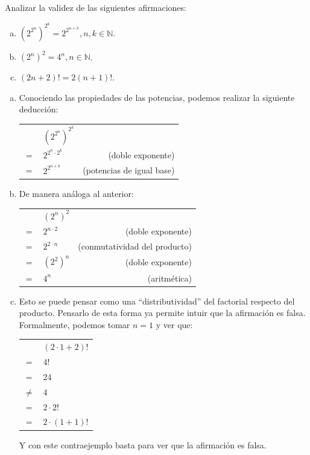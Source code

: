 \begin{problem}{}{}

    Analizar la validez de las siguientes afirmaciones:

    \begin{enumerate}[(a)]
        \item ${(2^{2^n})}^{2^k} = 2^{2^{n+k}}, n, k \in \mathbb{N}$.
        \item ${(2^n)}^2 = 4^n, n \in \mathbb{N}$.
        \item $(2n + 2)! = 2(n + 1)!$.
    \end{enumerate}

\end{problem}
\vspace{1ex}

\begin{enumerate}[(a)]
    \item Conociendo las propiedades de las potencias, podemos realizar la siguiente deducción:
    
          \begin{tabular}{|l l r}
             & ${(2^{2^n})}^{2^k}$ & \\
            $=$ & $2^{2^n \cdot 2^k}$ & (doble exponente) \\
            $=$ & $2^{2^{n+k}}$ & (potencias de igual base) \\
          \end{tabular}

    \item De manera análoga al anterior:

          \begin{tabular}{|l l r}
             & ${(2^n)}^2$ & \\
            $=$ & $2^{n \cdot 2}$ & (doble exponente) \\
            $=$ & $2^{2 \cdot n}$ & (conmutatividad del producto) \\
            $=$ & ${(2^2)}^n$ & (doble exponente) \\
            $=$ & $4^n$ & (aritmética) \\
          \end{tabular}

    \item Esto se puede pensar como una ``distributividad'' del factorial respecto del producto.
          Pensarlo de esta forma ya permite intuir que la afirmación es falsa.
          Formalmente, podemos tomar $n=1$ y ver que:

          \begin{tabular}{|l l}
             & $(2 \cdot 1 + 2)!$ \\
            $=$ & $4!$ \\
            $=$ & $24$ \\
            $\neq$ & $4$ \\
            $=$ & $2 \cdot 2!$ \\
            $=$ & $2 \cdot (1+1)!$ \\
          \end{tabular}

          Y con este contraejemplo basta para ver que la afirmación es falsa. 
\end{enumerate}
